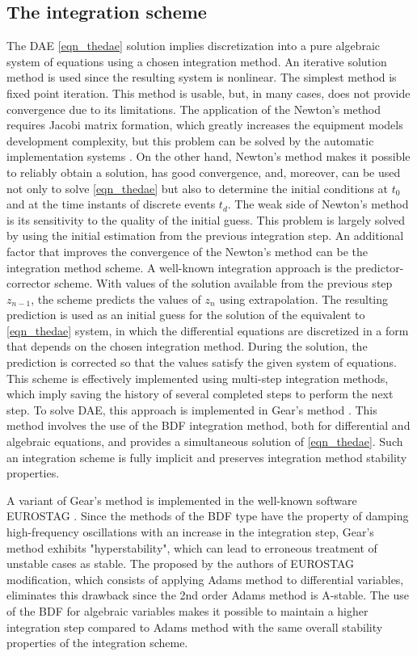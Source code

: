 \documentclass[lettersize,journal]{IEEEtran}
\begin{document}
\subsection{The integration scheme}

The DAE \eqref{eqn_thedae} solution implies discretization into a pure algebraic system of equations using a chosen integration method. An iterative solution method is used since the resulting system is nonlinear. The simplest method is fixed point iteration. This method is usable, but, in many cases, does not provide convergence due to its limitations. The application of the Newton's method requires Jacobi matrix formation, which greatly increases the equipment models development complexity, but this problem can be solved by the automatic implementation systems \cite{mycompiler}. On the other hand, Newton's method makes it possible to reliably obtain a solution, has good convergence, and, moreover, can be used not only to solve \eqref{eqn_thedae} but also to determine the initial conditions at \(t_0\) and at the time instants of discrete events \(t_d\). The weak side of Newton's method is its sensitivity to the quality of the initial guess. This problem is largely solved by using the initial estimation from the previous integration step. An additional factor that improves the convergence of the Newton's method can be the integration method scheme. A well-known integration approach is the predictor-corrector scheme. With values of the solution available from the previous step \(z_{n-1}\), the scheme predicts the values of \(z_n\) using extrapolation. The resulting prediction is used as an initial guess for the solution of the equivalent to \eqref{eqn_thedae} system, in which the differential equations are discretized in a form that depends on the chosen integration method. During the solution, the prediction is corrected so that the values satisfy the given system of equations. This scheme is effectively implemented using multi-step integration methods, which imply saving the history of several completed steps to perform the next step. To solve DAE, this approach is implemented in Gear's method \cite{gear71}. This method involves the use of the BDF integration method, both for differential and algebraic equations, and provides a simultaneous solution of \eqref{eqn_thedae}. Such an integration scheme is fully implicit and preserves integration method stability properties.

A variant of Gear's method is implemented in the well-known software EUROSTAG \cite{mixedadams}. Since the methods of the BDF type have the property of damping high-frequency oscillations with an increase in the integration step, Gear's method exhibits "hyperstability", which can lead to erroneous treatment of unstable cases as stable. The proposed by the authors of EUROSTAG modification, which consists of applying Adams method to differential variables, eliminates this drawback since the 2nd order Adams method is A-stable. The use of the BDF for algebraic variables makes it possible to maintain a higher integration step compared to Adams method with the same overall stability properties of the integration scheme.
\end{document}
